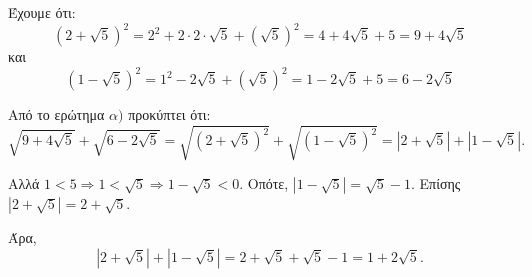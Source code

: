 
\begin{alist}
\item Έχουμε ότι:
\[(2 + \sqrt{5})^2 = 2^2 + 2 \cdot 2 \cdot \sqrt{5} + (\sqrt{5})^2 = 4 + 4\sqrt{5} + 5 = 9 + 4\sqrt{5}\]
και
\[(1 - \sqrt{5})^2 = 1^2 - 2\sqrt{5} + (\sqrt{5})^2 = 1 - 2\sqrt{5} + 5 = 6 - 2\sqrt{5}\]

\item Από το ερώτημα $\alpha)$ προκύπτει ότι:
\[\sqrt{9 + 4\sqrt{5}} + \sqrt{6 - 2\sqrt{5}} = \sqrt{(2 + \sqrt{5})^2} + \sqrt{(1 - \sqrt{5})^2} = |2 + \sqrt{5}| + |1 - \sqrt{5}|.\]

Αλλά $1 < 5 \Rightarrow 1 < \sqrt{5} \Rightarrow 1 - \sqrt{5} < 0$. Οπότε, $|1 - \sqrt{5}| = \sqrt{5} - 1$.
Επίσης $|2 + \sqrt{5}| = 2 + \sqrt{5}$.

Άρα,
\[|2 + \sqrt{5}| + |1 - \sqrt{5}| = 2 + \sqrt{5} + \sqrt{5} - 1 = 1 + 2\sqrt{5}.\]
\end{alist}


